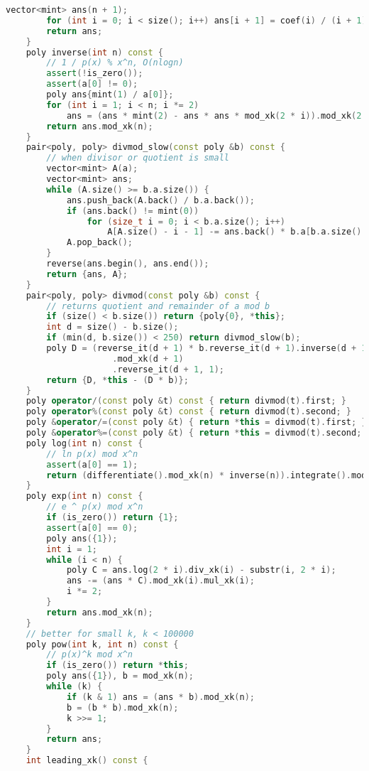 \documentclass[10pt, a4paper, oneside]{book}
\begin{document}
\begin{lstlisting}[language=C++]
        vector<mint> ans(n + 1);
        for (int i = 0; i < size(); i++) ans[i + 1] = coef(i) / (i + 1);
        return ans;
    }
    poly inverse(int n) const {
        // 1 / p(x) % x^n, O(nlogn)
        assert(!is_zero());
        assert(a[0] != 0);
        poly ans{mint(1) / a[0]};
        for (int i = 1; i < n; i *= 2)
            ans = (ans * mint(2) - ans * ans * mod_xk(2 * i)).mod_xk(2 * i);
        return ans.mod_xk(n);
    }
    pair<poly, poly> divmod_slow(const poly &b) const {
        // when divisor or quotient is small
        vector<mint> A(a);
        vector<mint> ans;
        while (A.size() >= b.a.size()) {
            ans.push_back(A.back() / b.a.back());
            if (ans.back() != mint(0))
                for (size_t i = 0; i < b.a.size(); i++)
                    A[A.size() - i - 1] -= ans.back() * b.a[b.a.size() - i - 1];
            A.pop_back();
        }
        reverse(ans.begin(), ans.end());
        return {ans, A};
    }
    pair<poly, poly> divmod(const poly &b) const {
        // returns quotient and remainder of a mod b
        if (size() < b.size()) return {poly{0}, *this};
        int d = size() - b.size();
        if (min(d, b.size()) < 250) return divmod_slow(b);
        poly D = (reverse_it(d + 1) * b.reverse_it(d + 1).inverse(d + 1))
                     .mod_xk(d + 1)
                     .reverse_it(d + 1, 1);
        return {D, *this - (D * b)};
    }
    poly operator/(const poly &t) const { return divmod(t).first; }
    poly operator%(const poly &t) const { return divmod(t).second; }
    poly &operator/=(const poly &t) { return *this = divmod(t).first; }
    poly &operator%=(const poly &t) { return *this = divmod(t).second; }
    poly log(int n) const {
        // ln p(x) mod x^n
        assert(a[0] == 1);
        return (differentiate().mod_xk(n) * inverse(n)).integrate().mod_xk(n);
    }
    poly exp(int n) const {
        // e ^ p(x) mod x^n
        if (is_zero()) return {1};
        assert(a[0] == 0);
        poly ans({1});
        int i = 1;
        while (i < n) {
            poly C = ans.log(2 * i).div_xk(i) - substr(i, 2 * i);
            ans -= (ans * C).mod_xk(i).mul_xk(i);
            i *= 2;
        }
        return ans.mod_xk(n);
    }
    // better for small k, k < 100000
    poly pow(int k, int n) const {
        // p(x)^k mod x^n
        if (is_zero()) return *this;
        poly ans({1}), b = mod_xk(n);
        while (k) {
            if (k & 1) ans = (ans * b).mod_xk(n);
            b = (b * b).mod_xk(n);
            k >>= 1;
        }
        return ans;
    }
    int leading_xk() const {

\end{lstlisting}
\end{document}
